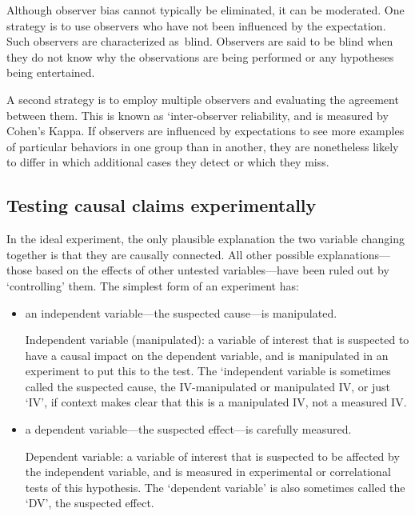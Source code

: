 \begin{refsection}
Although observer bias cannot typically be eliminated, it can be moderated. One strategy is to use observers who have not been influenced by the expectation. Such observers are characterized as blind. Observers are said to be blind when they do not know why the observations are being performed or any hypotheses being entertained.

A second strategy is to employ multiple observers and evaluating the agreement between them. This is known as ‘inter-observer reliability, and is measured by Cohen’s Kappa. If observers are influenced by expectations to see more examples of particular behaviors in one group than in another, they are nonetheless likely to differ in which additional cases they detect or which they miss.

\subsection{Testing causal claims experimentally}
\label{testingcausalclaimsexperimentally}

In the ideal experiment, the only plausible explanation the two variable changing together is that they are causally connected. All other possible explanations—those based on the effects of other untested variables—have been ruled out by ‘controlling’ them. The simplest form of an experiment has:

\begin{itemize}
\item an independent variable—the suspected cause—is manipulated.
\begin{thesis}
Independent variable (manipulated): a variable of interest that is suspected to have a causal impact on the dependent variable, and is manipulated in an experiment to put this to the test.\newline
The ‘independent variable is sometimes called the suspected cause, the IV-manipulated or manipulated IV, or just ‘IV’, if context makes clear that this is a manipulated IV, not a measured IV.
\end{thesis}

\item a dependent variable—the suspected effect—is carefully measured. \begin{thesis}
Dependent variable: a variable of interest that is suspected to be affected by the independent variable, and is measured in experimental or correlational tests of this hypothesis.
\newline
The ‘dependent variable’ is also sometimes called the ‘DV’, the suspected effect.
\end{thesis}


\end{itemize}
\end{refsection}
